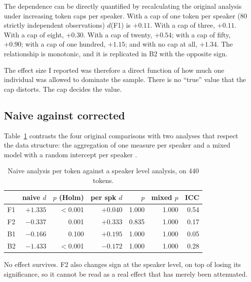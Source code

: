 \documentclass[11pt]{article}
\begin{document}
The dependence can be directly quantified by recalculating the original analysis
under increasing token caps per speaker. With a cap of one token per speaker (80
strictly independent observations) $d$(F1) is $+0.11$. With a cap of three,
$+0.11$. With a cap of eight, $+0.30$. With a cap of twenty, $+0.54$; with a cap
of fifty, $+0.90$; with a cap of one hundred, $+1.15$; and with no cap at all,
$+1.34$. The relationship is monotonic, and it is replicated in B2 with the
opposite sign.

The effect size I reported was therefore a direct function of how much one
individual was allowed to dominate the sample. There is no ``true'' value that
the cap distorts. The cap decides the value.

\subsection{Naive against corrected}

Table~\ref{tab:naive} contrasts the four original comparisons with two analyses
that respect the data structure: the aggregation of one measure per speaker and a
mixed model with a random intercept per speaker \citep{barr2013,winter2019}.

\begin{table}[t]
\centering
\small
\setlength{\tabcolsep}{4pt}
\begin{tabular}{lrrrrrr}
\toprule
 & \makecell{naive\\$d$} & \makecell{$p$\\(Holm)} &
 \makecell{per spk\\$d$} & $p$ & \makecell{mixed\\$p$} & ICC \\
\midrule
F1 & $+1.335$ & $<$0.001 & $+0.040$ & 1.000 & 1.000 & 0.54 \\
F2 & $-0.337$ & 0.001    & $+0.333$ & 0.835 & 1.000 & 0.17 \\
B1 & $-0.166$ & 0.100    & $+0.195$ & 1.000 & 1.000 & 0.05 \\
B2 & $-1.433$ & $<$0.001 & $-0.172$ & 1.000 & 1.000 & 0.28 \\
\bottomrule
\end{tabular}
\caption{Naive analysis per token against a speaker level analysis, on 440
tokens.}
\label{tab:naive}
\end{table}

No effect survives. F2 also changes sign at the speaker level, on top of losing
its significance, so it cannot be read as a real effect that has merely been
attenuated.
\end{document}
